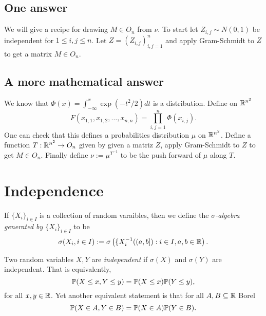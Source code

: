 \subsection{One answer}
We will give a recipe for drawing $M \in O_n$ from $\nu$. To start let $Z_{i,j} \sim N(0,1)$ be independent for $1\le i,j \le n$. Let $Z= (Z_{i,j})_{i,j=1}^n$ and apply Gram-Schmidt to $Z$ to get a matrix $M \in O_n$. 

\subsection{A more mathematical answer}
We know that $\Phi(x) = \int_{-\infty}^x \exp(-t^2/2)dt$ is a distribution. Define on ${\mathbb R}^{n^2}$ 
\[F(x_{1,1}, x_{1,2},\ldots, x_{n,n}) = \prod_{i,j=1}^n \Phi(x_{i,j}). \]
One can check that this defines a probabilities distribution $\mu$ on ${\mathbb R}^{n^2}$. Define a function $T : {\mathbb R}^{n^2} \to O_n$ given by given a matriz $Z$, apply Gram-Schmidt to $Z$ to get $M \in O_n$. Finally define $\nu := \mu^{T^{-1}}$ to be the push forward of $\mu$ along $T$.

\section{Independence}
\begin{defn}
    If $\{X_i\}_{i \in I}$ is a collection of random varaibles, then we define the \emph{$\sigma$-algebra generated by $\{X_i\}_{i \in I}$} to be 
    \[\sigma(X_i, i \in I) := \sigma\left(\{X_i^{-1}((a,b]): i\in I, a,b \in {\mathbb R}\right). \]
\end{defn}
\begin{defn}
    Two random variables $X,Y$ are \emph{independent} if $\sigma(X)$ and $\sigma(Y)$ are independent. That is equivalently, 
    \[{\mathbb{P}}(X \le x, Y \le y) = {\mathbb{P}}(X \le x){\mathbb{P}}(Y \le y), \]
    for all $x,y \in {\mathbb R}$. Yet another equivalent statement  is that for all $A,B \subseteq {\mathbb R}$ Borel
    \[{\mathbb{P}}(X \in A, Y \in B) = {\mathbb{P}}(X \in A) {\mathbb{P}}(Y \in B). \]
\end{defn}

